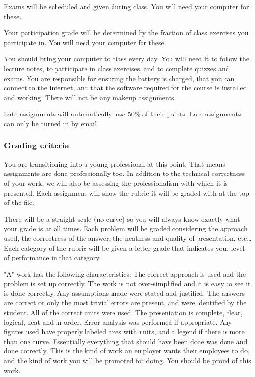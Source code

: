 \documentclass[11pt]{article}
\begin{document}
Exams will be scheduled and given during class. You will need your computer for these.

Your participation grade will be determined by the fraction of class exercises you participate in. You will need your computer for these.

You should bring your computer to class every day. You will need it to follow the lecture notes, to participate in class exercises, and to complete quizzes and exams. You are responsible for ensuring the battery is charged, that you can connect to the internet, and that the software required for the course is installed and working. There will not be any makeup assignments.

Late assignments will automatically lose 50\% of their points. Late assignments can only be turned in by email.

\subsubsection{Grading criteria}
\label{sec:orgheadline9}

You are transitioning into a young professional at this point. That means assignments are done professionally too. In addition to the technical correctness of your work, we will also be assessing the professionalism with which it is presented. Each assignment will show the rubric it will be graded with at the top of the file.

There will be a straight scale (no curve) so you will always know exactly what your grade is at all times. Each problem will be graded considering the approach used, the correctness of the answer, the neatness and quality of presentation, etc\ldots{} Each category of the rubric will be given a letter grade that indicates your level of performance in that category.

"A" work has the following characteristics: The correct approach is used and the problem is set up correctly. The work is not over-simplified and it is easy to see it is done correctly. Any assumptions made were stated and justified. The answers are correct or only the most trivial errors are present, and were identified by the student. All of the correct units were used. The presentation is complete, clear, logical, neat and in order. Error analysis was performed if appropriate. Any figures used have properly labeled axes with units, and a legend if there is more than one curve. Essentially everything that should have been done was done and done correctly. This is the kind of work an employer wants their employees to do, and the kind of work you will be promoted for doing. You should be proud of this work.
\end{document}
